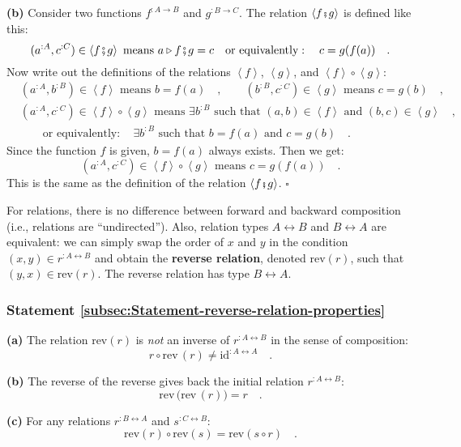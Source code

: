 \textbf{(b)} Consider two functions $f^{:A\rightarrow B}$ and $g^{:B\rightarrow C}$.
The relation $\left<f\bef g\right>$ is defined like this:
\[
(a^{:A},c^{:C})\in\left<f\bef g\right>\text{ means }a\triangleright f\bef g=c\quad\text{or equivalently}:\quad c=g(f(a))\quad.
\]
Now write out the definitions of the relations $\left<f\right>$,
$\left<g\right>$, and $\left<f\right>\circ\left<g\right>$:
\begin{align*}
 & (a^{:A},b^{:B})\in\left<f\right>\text{ means }b=f(a)\quad,\quad\quad(b^{:B},c^{:C})\in\left<g\right>\text{ means }c=g(b)\quad,\\
 & (a^{:A},c^{:C})\in\left<f\right>\circ\left<g\right>\text{ means }\exists b^{:B}\text{ such that }(a,b)\in\left<f\right>\text{ and }(b,c)\in\left<g\right>\quad,\\
 & \quad\quad\text{or equivalently}:\quad\exists b^{:B}\text{ such that }b=f(a)\text{ and }c=g(b)\quad.
\end{align*}
Since the function $f$ is given, $b=f(a)$ always exists. Then we
get:
\[
(a^{:A},c^{:C})\in\left<f\right>\circ\left<g\right>\text{ means }c=g(f(a))\quad.
\]
This is the same as the definition of the relation $\left<f\bef g\right>$.
$\square$

For relations, there is no difference between forward and backward
composition (i.e., relations are \textsf{``}undirected\textsf{''}). Also, relation
types $A\leftrightarrow B$ and $B\leftrightarrow A$ are equivalent:
we can simply swap the order of $x$ and $y$ in the condition $(x,y)\in r^{:A\leftrightarrow B}$
and obtain the \textbf{reverse relation},
denoted $\text{rev}\left(r\right)$, such that $(y,x)\in\text{rev}\left(r\right)$.
The reverse relation has type $B\leftrightarrow A$.

\subsubsection{Statement \label{subsec:Statement-reverse-relation-properties}\ref{subsec:Statement-reverse-relation-properties}}

\textbf{(a)} The relation $\text{rev}(r)$ is \emph{not} an inverse
of $r^{:A\leftrightarrow B}$ in the sense of composition:
\[
r\circ\text{rev}\,(r)\neq\text{id}^{:A\leftrightarrow A}\quad.
\]

\textbf{(b)} The reverse of the reverse gives back the initial relation
$r^{:A\leftrightarrow B}$:
\[
\text{rev}\,\big(\text{rev}\,(r)\big)=r\quad.
\]

\textbf{(c)} For any relations $r^{:B\leftrightarrow A}$ and $s^{:C\leftrightarrow B}$:
\[
\text{rev}\left(r\right)\circ\text{rev}\left(s\right)=\text{rev}\left(s\circ r\right)\quad.
\]


